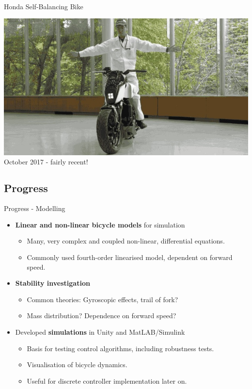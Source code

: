 \documentclass{beamer}
\begin{document}
\begin{frame}{Honda Self-Balancing Bike}

	\centering
	\includegraphics[scale=0.6]{Honda}
	October 2017 - fairly recent!
	
\end{frame}

\subsection{Progress}

\begin{frame}{Progress - Modelling}
 
  \begin{itemize}
  
  	\setlength\itemsep{0.5em}
  	\item {\textbf{Linear and non-linear bicycle models} for simulation}
  	
  	\begin{itemize}
  		\item Many, very complex and coupled non-linear, differential equations.
  		\item Commonly used fourth-order linearised model, dependent on forward speed.
  	\end{itemize}
  	
  	\item {\textbf{Stability investigation}}
  	\begin{itemize}
  		\item Common theories: Gyroscopic effects, trail of fork?
  		\item Mass distribution? Dependence on forward speed?
  	\end{itemize}
  	
	\item {Developed \textbf{simulations} in Unity and MatLAB/Simulink}
	
	\begin{itemize}
		\item Basis for testing control algorithms, including robustness tests.
		\item Visualisation of bicycle dynamics.
		\item Useful for discrete controller implementation later on.
	\end{itemize}		
	
  \end{itemize}
    
\end{frame}
\end{document}
